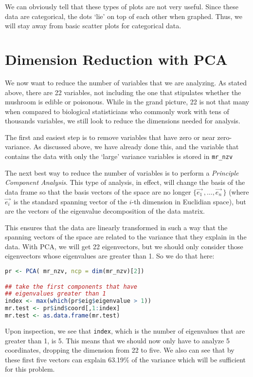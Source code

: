 \documentclass{article}
\begin{document}
We can obviously tell that these types of plots are not very useful. Since these data are categorical, the dots `lie' on top of each other when graphed. Thus, we will stay away from basic scatter plots for categorical data. 


\section{Dimension Reduction with PCA}

We now want to reduce the number of variables that we are analyzing. As stated above, there are 22 variables, not including the one that stipulates whether the mushroom is edible or poisonous. While in the grand picture, 22 is not that many when compared to biological statisticians who commonly work with tens of thousands variables, we still look to reduce the dimensions needed for analysis. 

The first and easiest step is to remove variables that have zero or near zero-variance. As discussed above, we have already done this, and the variable that contains the data with only the `large' variance variables is stored in \texttt{mr\_nzv}

The next best way to reduce the number of variables is to perform a \emph{Principle Component Analysis}. This type of analysis, in effect, will change the basis of the data frame so that the basis vectors of the space are no longer $\{ \vec{e_1}^{\,}, \dots, \vec{e_n}^{\,} \}$ (where $\vec{e_i}^{\,}$ is the standard spanning vector of the $i$-th dimension in Euclidian space), but are the vectors of the eigenvalue decomposition of the data matrix. 

This ensures that the data are linearly transformed in such a way that the spanning vectors of the space are related to the variance that they explain in the data. With PCA, we will get 22 eigenvectors, but we should only consider those eigenvectors whose eigenvalues are greater than 1. So we do that here:

\begin{lstlisting}[language=R, frame=single]
pr <- PCA( mr_nzv, ncp = dim(mr_nzv)[2])

## take the first components that have
## eigenvalues greater than 1
index <- max(which(pr$eig$eigenvalue > 1))
mr.test <- pr$ind$coord[,1:index]
mr.test <- as.data.frame(mr.test)
\end{lstlisting}

Upon inspection, we see that \texttt{index}, which is the number of eigenvalues that are greater than 1, is 5. This means that we should now only have to analyze 5 coordinates, dropping the dimension from 22 to five. We also can see that by these first five vectors can explain 63.19\% of the variance which will be sufficient for this problem.
\end{document}
